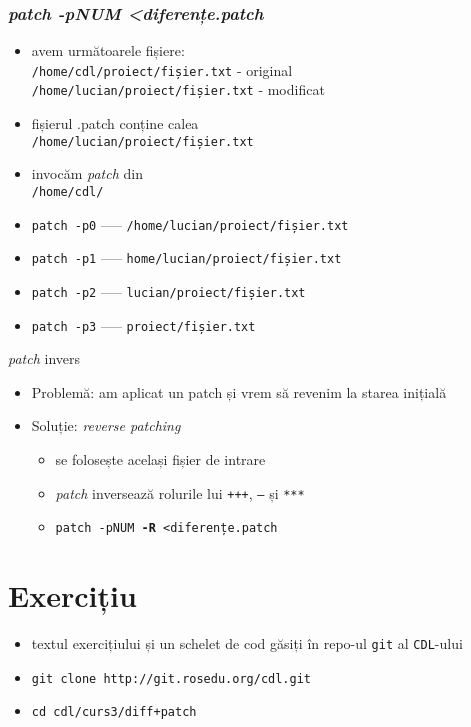 \documentclass{beamer}
\begin{document}
\begin{frame}
  \frametitle{\textit{patch -pNUM \textless diferențe.patch}}
  \begin{itemize}[<+->]
  \item avem următoarele fișiere:                        \\
    \texttt{/home/cdl/proiect/fișier.txt} - original     \\
    \texttt{/home/lucian/proiect/fișier.txt} - modificat \\
  \item fișierul .patch conține calea \\
    \texttt{/home/lucian/proiect/fișier.txt}
  \item invocăm \textit{patch} din \\
    \texttt{/home/cdl/}
  \item \texttt{patch -p0} ––– \texttt{/home/lucian/proiect/fișier.txt}
  \item \texttt{patch -p1} ––– \texttt{home/lucian/proiect/fișier.txt}
  \item \texttt{patch -p2} ––– \texttt{lucian/proiect/fișier.txt}
  \item \texttt{patch -p3} ––– \texttt{proiect/fișier.txt}
  \end{itemize}
\end{frame}


\begin{frame}{\textit{patch} invers}
  \begin{itemize}[<+->]
  \item Problemă: am aplicat un patch și vrem să revenim la starea inițială
  \item Soluție: \textit{reverse patching}
    \begin{itemize}
    \item se folosește același fișier de intrare
    \item \textit{patch} inversează rolurile lui \texttt{+++}, \texttt{---} și \texttt{***}
    \item \texttt{patch -pNUM \textbf{-R} \textless diferențe.patch}
    \end{itemize}
  \end{itemize}
\end{frame}

\section{Exercițiu}
\frame{\tableofcontents[currentsection]}
\begin{frame}
  \begin{itemize}
  \item textul exercițiului și un schelet de cod găsiți în repo-ul \texttt{git} al \texttt{CDL}-ului
  \item \texttt{git clone http://git.rosedu.org/cdl.git}
  \item \texttt{cd cdl/curs3/diff+patch}
  \end{itemize}
\end{frame}
\end{document}
